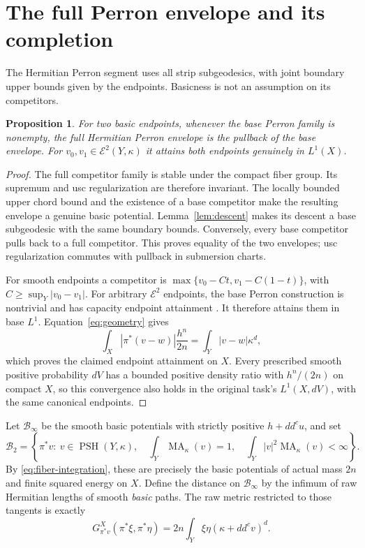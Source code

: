 \documentclass[11pt]{article}
\newcommand{\ddc}{dd^c}
\newcommand{\PSH}{\operatorname{PSH}}
\newcommand{\MA}{\operatorname{MA}}
\newcommand{\BB}{\mathcal B}
\newtheorem{proposition}[theorem]{Proposition}
\theoremstyle{remark}\newtheorem{remark}[theorem]{Remark}
\begin{document}
\section{The full Perron envelope and its completion}
The Hermitian Perron segment uses all strip subgeodesics, with joint
boundary upper bounds given by the endpoints. Basicness is not an
assumption on its competitors.
\begin{proposition}\label{prop:perron}
For two basic endpoints, whenever the base Perron family is nonempty,
the full Hermitian Perron envelope is the pullback of the base envelope.
For $v_0,v_1\in\mathcal E^2(Y,\kappa)$ it attains both endpoints
genuinely in $L^1(X)$.
\end{proposition}
\begin{proof}
The full competitor family is stable under the compact fiber group.
Its supremum and usc regularization are therefore invariant. The locally
bounded upper chord bound and the existence of a base competitor make
the resulting envelope a genuine basic potential. Lemma~\ref{lem:descent}
makes its descent a base subgeodesic with the same boundary bounds.
Conversely, every base competitor pulls back to a full competitor.
This proves equality of the two envelopes; usc regularization commutes
with pullback in submersion charts.

For smooth endpoints a competitor is
$\max\{v_0-Ct,v_1-C(1-t)\}$, with
$C\geq\sup_Y|v_0-v_1|$. For arbitrary $\mathcal E^2$ endpoints,
the base Perron construction is nontrivial and has capacity endpoint
attainment \cite[Theorem 5.2 and Corollary 5.4]{Darvas}. It therefore
attains them in base $L^1$. Equation~\eqref{eq:geometry} gives
\[
 \int_X|\pi^*(v-w)|\frac{h^n}{2n}
       =\int_Y|v-w|\kappa^d,
\]
which proves the claimed endpoint attainment on $X$. Every prescribed
smooth positive probability $dV$ has a bounded positive density ratio
with $h^n/(2n)$ on compact $X$, so this convergence also holds in the
original task's $L^1(X,dV)$, with the same canonical endpoints.
\end{proof}

Let $\BB_\infty$ be the smooth basic potentials with strictly positive
$h+\ddc u$, and set
\[
 \BB_2=\left\{\pi^*v:\ v\in\PSH(Y,\kappa),\quad
 \int_Y\MA_\kappa(v)=1,\quad
 \int_Y|v|^2\MA_\kappa(v)<\infty\right\}.
\]
By \eqref{eq:fiber-integration}, these are precisely the basic potentials
of actual mass $2n$ and finite squared energy on $X$.
Define the distance on $\BB_\infty$ by the infimum of raw Hermitian
lengths of smooth \emph{basic} paths. The raw metric restricted to those
tangents is exactly
\begin{equation}\label{eq:metric}
 G^X_{\pi^*v}(\pi^*\xi,\pi^*\eta)
       =2n\int_Y\xi\eta(\kappa+\ddc v)^d.
\end{equation}
\end{document}
